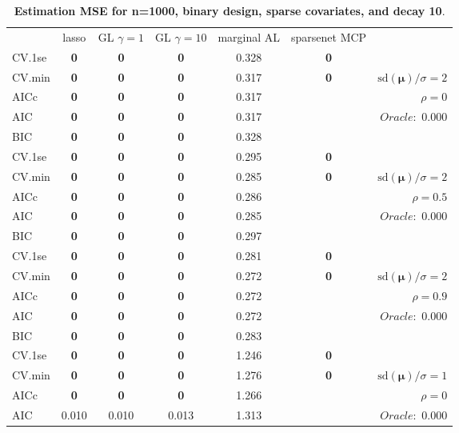 \clearpage
\begin{table}\vspace{-.5cm}
\caption[l]{ { \bf Estimation MSE for n=1000, binary design, 
sparse covariates, and  decay  10}.}
\vspace{-.5cm}
\footnotesize{}
\begin{center}
\begin{tabular}{l*{5}{c}|r}
& lasso & GL $\gamma=1$ & GL $\gamma=10$ & marginal AL & sparsenet MCP  & \\
 \cline{1-7}
CV.1se & {\bf 0} & {\bf 0} & {\bf 0} & 0.328 & {\bf 0} & \\
CV.min & {\bf 0} & {\bf 0} & {\bf 0} & 0.317 & {\bf 0} &  $\mathrm{sd}(\mathbf{\mu})/\sigma=2$ \\
AICc & {\bf 0} & {\bf 0} & {\bf 0} & 0.317 & & $\rho=0$ \\
AIC & {\bf 0} & {\bf 0} & {\bf 0} & 0.317 & &  \multirow{2}{*}{$Oracle: $ 0.000} \\
BIC & {\bf 0} & {\bf 0} & {\bf 0} & 0.328 & &  \\
 \hline 
CV.1se & {\bf 0} & {\bf 0} & {\bf 0} & 0.295 & {\bf 0} & \\
CV.min & {\bf 0} & {\bf 0} & {\bf 0} & 0.285 & {\bf 0} &  $\mathrm{sd}(\mathbf{\mu})/\sigma=2$ \\
AICc & {\bf 0} & {\bf 0} & {\bf 0} & 0.286 & & $\rho=0.5$ \\
AIC & {\bf 0} & {\bf 0} & {\bf 0} & 0.285 & &  \multirow{2}{*}{$Oracle: $ 0.000} \\
BIC & {\bf 0} & {\bf 0} & {\bf 0} & 0.297 & &  \\
 \hline 
CV.1se & {\bf 0} & {\bf 0} & {\bf 0} & 0.281 & {\bf 0} & \\
CV.min & {\bf 0} & {\bf 0} & {\bf 0} & 0.272 & {\bf 0} &  $\mathrm{sd}(\mathbf{\mu})/\sigma=2$ \\
AICc & {\bf 0} & {\bf 0} & {\bf 0} & 0.272 & & $\rho=0.9$ \\
AIC & {\bf 0} & {\bf 0} & {\bf 0} & 0.272 & &  \multirow{2}{*}{$Oracle: $ 0.000} \\
BIC & {\bf 0} & {\bf 0} & {\bf 0} & 0.283 & &  \\
 \hline 
CV.1se & {\bf 0} & {\bf 0} & {\bf 0} & 1.246 & {\bf 0} & \\
CV.min & {\bf 0} & {\bf 0} & {\bf 0} & 1.276 & {\bf 0} &  $\mathrm{sd}(\mathbf{\mu})/\sigma=1$ \\
AICc & {\bf 0} & {\bf 0} & {\bf 0} & 1.266 & & $\rho=0$ \\
AIC & 0.010 & 0.010 & 0.013 & 1.313 & &  \multirow{2}{*}{$Oracle: $ 0.000} \\

\end{tabular}
\end{center}
\end{table}
